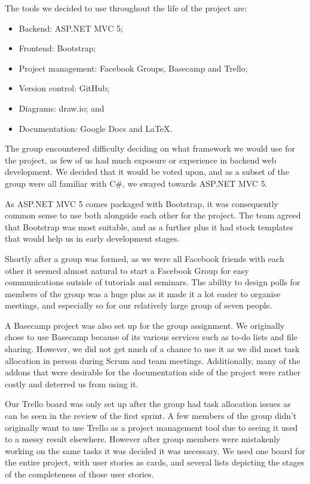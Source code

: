 \documentclass[a4paper,titlepage,12pt]{article}
\begin{document}
The tools we decided to use throughout the life of the project are:

\begin{itemize}
	\item Backend: ASP.NET MVC 5;
	\item Frontend: Bootstrap;
	\item Project management: Facebook Groups, Basecamp and Trello;
	\item Version control: GitHub;
	\item Diagrams: draw.io; and
	\item Documentation: Google Docs and \LaTeX.
\end{itemize}

The group encountered difficulty deciding on what framework we would use for
the project, as few of us had much exposure or experience in backend web
development. We decided that it would be voted upon, and as a subset of the
group were all familiar with C\#, we swayed towards ASP.NET MVC 5.

As ASP.NET MVC 5 comes packaged with Bootstrap, it was consequently common
sense to use both alongside each other for the project. The team agreed that
Bootstrap was most suitable, and as a further plus it had stock templates that
would help us in early development stages.

Shortly after a group was formed, as we were all Facebook friends with each
other it seemed almost natural to start a Facebook Group for easy
communications outside of tutorials and seminars. The ability to design polls
for members of the group was a huge plus as it made it a lot easier to organise
meetings, and especially so for our relatively large group of seven people.

A Basecamp project was also set up for the group assignment. We originally
chose to use Basecamp because of its various services such as to-do lists and
file sharing. However, we did not get much of a chance to use it as we did most
task allocation in person during Scrum and team meetings. Additionally, many of
the addons that were desirable for the documentation side of the project were
rather costly and deterred us from using it.

Our Trello board was only set up after the group had task allocation issues as
can be seen in the review of the first sprint. A few members of the group
didn't originally want to use Trello as a project management tool due to seeing
it used to a messy result elsewhere. However after group members were
mistakenly working on the same tasks it was decided it was necessary. We used
one board for the entire project, with user stories as cards, and several lists
depicting the stages of the completeness of those user stories.
\end{document}
